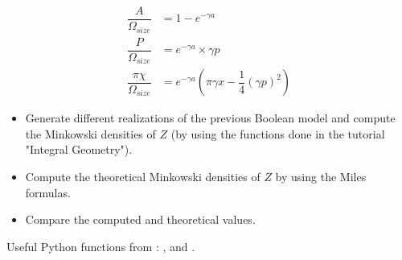 \begin{align}
\dfrac{A}{\Omega_{size}} & = 1-e^{-\gamma a}\\
\dfrac{P}{\Omega_{size}} & = e^{-\gamma a}\times \gamma p\\
\dfrac{\pi \chi}{\Omega_{size}} & = e^{-\gamma a} \left( \pi\gamma x - \dfrac{1}{4}(\gamma p)^2 \right)
\end{align}
\vspace*{-8pt}
\begin{qbox}
\begin{itemize}
\item Generate different realizations of the previous Boolean model and compute the Minkowski densities of $Z$ (by using the functions done in the tutorial "Integral Geometry").
\item Compute the theoretical Minkowski densities of $Z$ by using the Miles formulas.
\item Compare the computed and theoretical values. 
\end{itemize}
\end{qbox}

\begin{pcomment}
 \begin{premark}
  Useful Python functions from : , 
 and . 
 \end{premark}

\end{pcomment}
